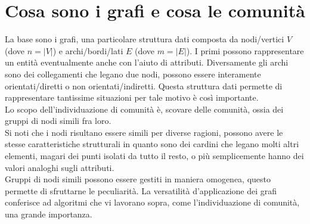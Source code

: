 \section{Cosa sono i grafi e cosa le comunità}
La base sono i grafi, una particolare struttura dati composta da nodi/vertici $V$ (dove $n=|V|$) e archi/bordi/lati $E$ (dove $m=|E|$). I primi possono rappresentare un entità eventualmente anche con l'aiuto di attributi. Diversamente gli archi sono dei collegamenti che legano due nodi, possono essere interamente orientati/diretti o non orientati/indiretti. Questa struttura dati permette di rappresentare tantissime situazioni per tale motivo è così importante.\\
Lo scopo dell'individuazione di comunità è, scovare delle comunità, ossia dei gruppi di nodi simili fra loro.\\
Si noti che i nodi risultano essere simili per diverse ragioni, possono avere le stesse caratteristiche strutturali in quanto sono dei cardini che legano molti altri elementi, magari dei punti isolati da tutto il resto, o più semplicemente hanno dei valori analoghi sugli attributi.\\
Gruppi di nodi simili possono essere gestiti in maniera omogenea, questo permette di sfruttarne le peculiarità. La versatilità d'applicazione dei grafi conferisce ad algoritmi che vi lavorano sopra, come l'individuazione di comunità, una grande importanza.
%
